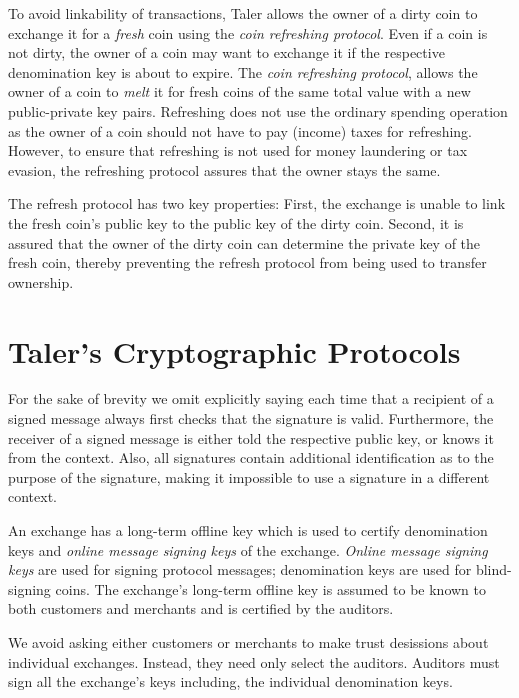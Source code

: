 \documentclass{llncs}
\begin{document}
To avoid linkability of transactions, Taler allows the owner of a
dirty coin to exchange it for a {\em fresh} coin using the {\em coin
  refreshing protocol}.  Even if a coin is not dirty, the owner of a
coin may want to exchange it if the respective denomination key is
about to expire.  The {\em coin refreshing protocol}, allows the owner
of a coin to {\em melt} it for fresh coins of the same total value with a
new public-private key pairs.  Refreshing does not use the ordinary
spending operation as the owner of a coin should not have to pay
(income) taxes for refreshing.  However, to ensure that refreshing is
not used for money laundering or tax evasion, the refreshing protocol
assures that the owner stays the same.

The refresh protocol has two key properties: First, the exchange is
unable to link the fresh coin's public key to the public key of the
dirty coin.  Second, it is assured that the owner of the dirty coin
can determine the private key of the fresh coin, thereby preventing
the refresh protocol from being used to transfer ownership.


\section{Taler's Cryptographic Protocols}

\def\KDF{\textrm{KDF}}
\def\FDH{\textrm{FDH}}


For the sake of brevity we omit explicitly saying each time that a
recipient of a signed message always first checks that the signature
is valid.  Furthermore, the receiver of a signed message is either
told the respective public key, or knows it from the context.  Also,
all signatures contain additional identification as to the purpose of
the signature, making it impossible to use a signature in a different
context.

An exchange has a long-term offline key which is used to certify
denomination keys and {\em online message signing keys} of the
exchange.  {\em Online message signing keys} are used for signing
protocol messages; denomination keys are used for blind-signing coins.
The exchange's long-term offline key is assumed to be known to both
customers and merchants and is certified by the auditors.

We avoid asking either customers or merchants to make trust desissions
about individual exchanges.  Instead, they need only select the auditors.
Auditors must sign all the exchange's keys including, the individual
denomination keys.
\end{document}
